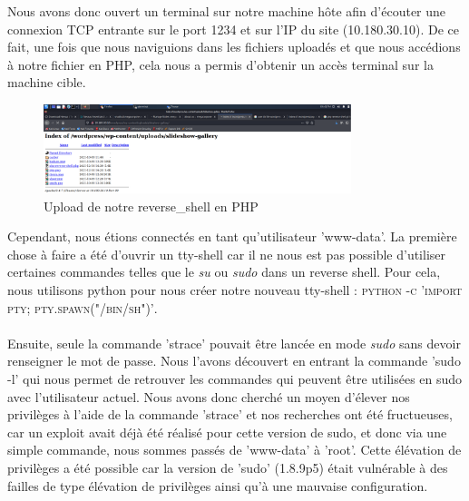 \documentclass[a4paper]{article}
\begin{document}
Nous avons donc ouvert un terminal sur notre machine hôte afin d'écouter une connexion TCP entrante sur le port 1234 et sur l'IP du site (10.180.30.10). De ce fait, une fois que nous naviguions dans les fichiers uploadés et que nous accédions à notre fichier en PHP, cela nous a permis d'obtenir un accès terminal sur la machine cible.\\

\begin{figure}[H]
    \centering
    \includegraphics[width=0.8\textwidth]{images/lab4/reverse_shell.png}
    \caption{Upload de notre reverse\_shell en PHP}
    \label{fig:phpshell}
\end{figure}

Cependant, nous étions connectés en tant qu'utilisateur 'www-data'. La première chose à faire a été d'ouvrir un tty-shell car il ne nous est pas possible d'utiliser certaines commandes telles que le \emph{su} ou \emph{sudo} dans un reverse shell. Pour cela, nous utilisons python pour nous créer notre nouveau tty-shell \cite{6}: \textsc{python -c 'import pty; pty.spawn("/bin/sh")'}. \\\\ Ensuite, seule la commande 'strace' pouvait être lancée en mode \emph{sudo} sans devoir renseigner le mot de passe. Nous l'avons découvert en entrant la commande 'sudo -l' qui nous permet de retrouver les commandes qui peuvent être utilisées en sudo avec l'utilisateur actuel. Nous avons donc cherché un moyen d'élever nos privilèges à l'aide de la commande 'strace' et nos recherches ont été fructueuses, car un exploit avait déjà été réalisé pour cette version de sudo, et donc via une simple commande, nous sommes passés de 'www-data' à 'root'. Cette élévation de privilèges a été possible car la version de 'sudo' (1.8.9p5) était vulnérable à des failles de type élévation de privilèges ainsi qu'à une mauvaise configuration.\cite{4}
\end{document}
